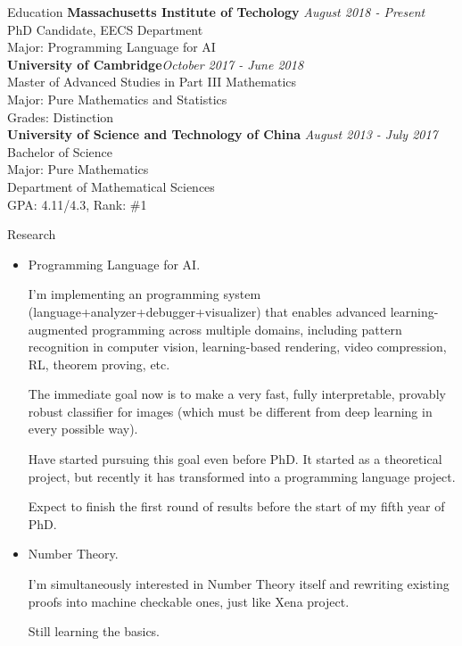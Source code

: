 \documentclass{resume} %
\begin{document}
  

\begin{rSection}{Education}
{\bf Massachusetts Institute of Techology} \hfill {\em August 2018 - Present} 
\\ PhD Candidate, EECS Department
\\ Major: Programming Language for AI
\\{\bf University of Cambridge}\hfill {\em October 2017 - June 2018} 
\\ Master of Advanced Studies in Part III Mathematics
\\ Major: Pure Mathematics and Statistics
\\ Grades: Distinction
\\{\bf University of Science and Technology of China} \hfill {\em August 2013 - July 2017} 
\\ Bachelor of Science
\\ Major: Pure Mathematics
\\ Department of Mathematical Sciences\\\hfill { GPA: 4.11/4.3, Rank: \#1 }

\end{rSection}

\begin{rSection}{Research}
\begin{itemize}
	\item 

Programming Language for AI.

I'm implementing an programming system (language+analyzer+debugger+visualizer) that enables advanced learning-augmented programming across multiple domains, including pattern recognition in computer vision, learning-based rendering, video compression, RL, theorem proving, etc.

The immediate goal now is to make a very fast, fully interpretable, provably robust classifier for images (which must be different from deep learning in every possible way).

Have started pursuing this goal even before PhD. It started as a theoretical project, but recently it has transformed into a programming language project.

Expect to finish the first round of results before the start of my fifth year of PhD.
\item Number Theory.

I'm simultaneously interested in Number Theory itself and rewriting existing proofs into machine checkable ones, just like Xena project.

Still learning the basics.
\end{itemize}

\end{rSection}
\end{document}
